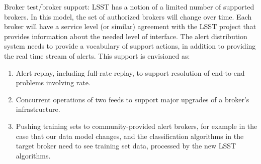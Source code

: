 Broker test/broker support: LSST has a notion of a limited number of supported brokers. In this model, the set of authorized brokers will change over time. Each broker will have a service level (or similar) agreement with the LSST project that provides information about the needed level of interface. The alert distribution system needs to provide a vocabulary of support actions, in addition to providing the real time stream of alerts. This support is envisioned as:

\begin{enumerate}

\item Alert replay, including full-rate replay, to support resolution of end-to-end problems involving rate.

\item Concurrent operations of two feeds to support major upgrades of a broker’s infrastructure. 

\item Pushing training sets to community-provided alert brokers, for example in the case that our data model changes, and the classification algorithms in the target broker need to see training set data, processed by the new LSST algorithms.

\end{enumerate}
